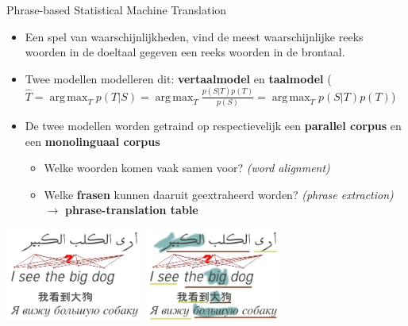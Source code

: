 \documentclass[8pt]{beamer}
\DeclareMathOperator*{\argmax}{arg\,max}
\begin{document}
\begin{frame}
    \begin{block}{Phrase-based Statistical Machine Translation}
        \begin{itemize}
            \item Een spel van waarschijnlijkheden, vind de meest waarschijnlijke reeks woorden in de doeltaal gegeven
                een reeks woorden in de brontaal.
            \item Twee modellen modelleren dit: \textbf{vertaalmodel} en \textbf{taalmodel}
                {\footnotesize ($\hat{T} = \argmax_T p(T|S) = \argmax_T \frac{p(S|T)p(T)}{p(S)} = \argmax_T p(S|T)p(T)$)
                }
            \item De twee modellen worden getraind op respectievelijk een \textbf{parallel corpus} en een \textbf{monolinguaal corpus}
            \begin{itemize}
                \item Welke woorden komen vaak samen voor? \emph{(word alignment)}
                \item Welke \textbf{frasen} kunnen daaruit geextraheerd worden? \emph{(phrase extraction)} $\rightarrow$
                    \textbf{phrase-translation table}
            \end{itemize}
        \end{itemize}
    \end{block}

	\begin{center}
	 \includegraphics[width=45.0mm]{../align1.png} \includegraphics[width=45.0mm]{../align2.png}
	\end{center}

\end{frame}
\end{document}
